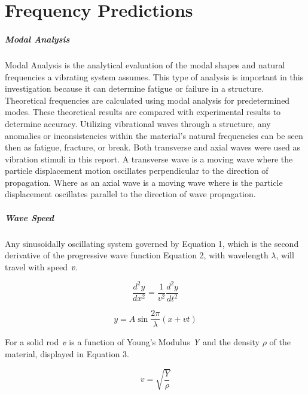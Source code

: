 \chapter{Frequency Predictions}
\paragraph{Modal Analysis}
 Modal Analysis is the analytical evaluation of the modal shapes and natural frequencies a vibrating system assumes. This type of analysis is important in this investigation because it can determine fatigue or failure in a structure. Theoretical frequencies are calculated using modal analysis for predetermined modes. These theoretical results are compared with experimental results to determine accuracy. Utilizing vibrational waves through a structure, any anomalies or inconsistencies within the material's natural frequencies can be seen then as fatigue, fracture, or break. Both transverse and axial waves were used as vibration stimuli in this report. 
A transverse wave is a moving wave where the particle displacement motion oscillates perpendicular to the direction of propagation.  
Where as an axial wave is a moving wave where is the particle displacement oscillates parallel to the direction of wave propagation.

\paragraph{Wave Speed} 
Any sinusoidally oscillating system governed by Equation 1, which is the second derivative of the progressive wave function Equation 2, with wavelength $\lambda$, will travel with speed $\emph{v}$.  

\begin{equation}
\frac{d^2y}{dx^2} = \frac{1}{v^2} \frac{d^2y}{dt^2}
\end{equation}

\begin{equation}
y = A\sin{\frac{2\pi}{\lambda}(x+vt)}
\end{equation}

For a solid rod $\emph{v}$ is a function of Young's Modulus $\emph{Y}$ and the density $\rho$ of the material, displayed in Equation 3. 

\begin{equation}
v=\sqrt{\frac{Y}{\rho}}
\end{equation}
